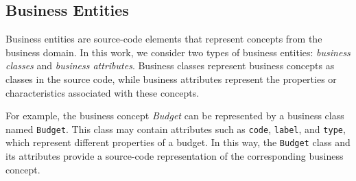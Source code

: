 \subsection{Business Entities}

Business entities are source-code elements that represent concepts from the business domain. In this work, we consider two types of business entities: \textit{business classes} and \textit{business attributes}. Business classes represent business concepts as classes in the source code, while business attributes represent the properties or characteristics associated with these concepts.

For example, the business concept \textit{Budget} can be represented by a business class named \texttt{Budget}. This class may contain attributes such as \texttt{code}, \texttt{label}, and \texttt{type}, which represent different properties of a budget. In this way, the \texttt{Budget} class and its attributes provide a source-code representation of the corresponding business concept.
